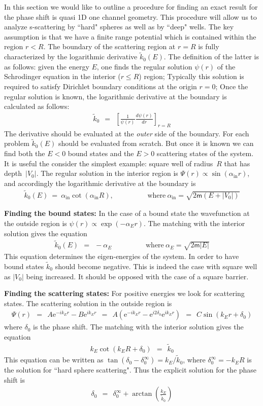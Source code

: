 \documentclass[onecolumn,fleqn]{revtex4}
\newcommand{\eexp}{\mathrm{e}^}
\newcommand{\mass}{\mathsf{m}}
\newcommand{\beq}{\begin{eqnarray}}
\newcommand{\eeq}{\end{eqnarray}}
\begin{document}
In this section we would like to outline 
a procedure for finding an exact result 
for the phase shift is quasi 1D one channel geometry. 
This procedure will allow us to analyze s-scattering 
by ``hard" spheres as well as by ``deep" wells. 
The key assumption is that we have a finite 
range potential which is contained within 
the region ${r<R}$. The boundary of the scattering 
region at ${r=R}$ is fully characterized by the logarithmic 
derivative $\tilde{k}_{0}(E)$. 
The definition of the latter is as follows: 
given the energy $E$, one finds the regular 
solution $\psi(r)$ of the Schrodinger 
equation in the interior (${r \le R}$) region;  
Typically this solution is required to 
satisfy Dirichlet boundary conditions 
at the origin ${r=0}$; Once the regular solution 
is known, the logarithmic derivative 
at the boundary is calculated as follows:
\beq
\tilde{k}_{0} \ \ = \ \ \left[\frac{1}{\psi(r)}\frac{d\psi(r)}{dr}\right]_{r=R}
\eeq
The derivative should be evaluated  
at the {\em outer} side of the boundary. 
For each problem $\tilde{k}_{0}(E)$
should be evaluated from scratch. 
But once it is known we can find both 
the ${E<0}$ bound states 
and the ${E>0}$ scattering states 
of the system. It is useful the consider the 
simplest example: square well of radius~$R$  
that has depth~$|V_0|$. The regular solution 
in the interior region is ${\Psi(r) \propto \sin(\alpha_{\text{in}} r)}$, 
and accordingly the logarithmic derivative 
at the boundary is 
\beq
\tilde{k}_{0}(E) \ = \ \alpha_{\text{in}} \cot(\alpha_{\text{in}} R), 
\hspace{2cm} \text{where} \ \alpha_{\text{in}}  = \sqrt{2\mass(E+|V_0|)}
\eeq


{\bf Finding the bound states:}
In the case of a bound 
state the wavefunction at the outside 
region is ${\psi(r) \propto \exp(-\alpha_E r)}$. 
The matching with the interior solution  
gives the equation 
\beq
\tilde{k}_{0}(E) \ \ = \ \ -\alpha_E
\hspace{2cm} \text{where} \ \alpha_E  = \sqrt{2\mass|E|}
\eeq
This equation determines the eigen-energies  
of the system. In order to have 
bound states $\tilde{k}_{0}$ should become  
negative. This is indeed the case 
with square well as $|V_0|$ being increased. 
It should be opposed with the case of 
a square barrier.



{\bf Finding the scattering states:}
For positive energies we look 
for scattering states.    
The scattering solution    
in the outside region is 
\beq
\Psi(r) 
\ \ = \ \ 
A\eexp{-ik_Er}-B\eexp{ik_Er} 
\ \ = \ \ 
A (\eexp{-ik_Er}- \eexp{i2\delta_0} \eexp{ik_Er}) 
\ \ =  \ \ 
C \sin(k_Er+\delta_0)
\eeq
where $\delta_0$ is the phase shift.
The matching with the interior solution 
gives the equation 
\beq
k_E\cot(k_ER+\delta_0) \ \ = \ \ \tilde{k}_{0}
\eeq
This equation can be written as 
$\tan(\delta_0-\delta_0^{\infty}) = {k_E}/{\tilde{k}_{0}}$, 
where $\delta_0^{\infty} = -k_ER$ is the solution 
for ``hard sphere scattering". Thus the explicit solution 
for the phase shift is 
\beq
\delta_0 \ \ = \ \ \delta_0^{\infty} + \arctan(\frac{k_E}{\tilde{k}_{0}})
\eeq
\end{document}

